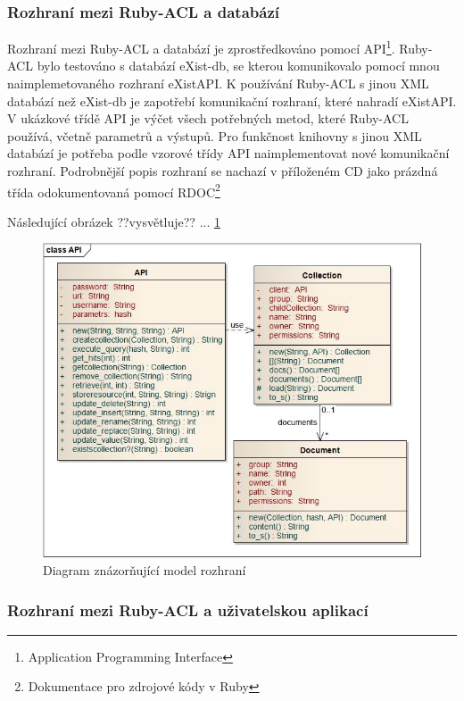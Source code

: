 \subsubsection{Rozhraní mezi Ruby-ACL a databází}
Rozhraní mezi Ruby-ACL a databází je zprostředkováno pomocí API\footnote[1]{Application Programming Interface}.
Ruby-ACL bylo testováno s databází eXist-db, se kterou komunikovalo pomocí mnou naimplemetovaného rozhraní eXistAPI. 
K používání Ruby-ACL s jinou XML databází než eXist-db je zapotřebí komunikační rozhraní, které nahradí eXistAPI. 
V ukázkové třídě API je výčet všech potřebných metod, které Ruby-ACL používá, včetně parametrů a výstupů. Pro funkčnost knihovny s jinou XML databází je potřeba podle vzorové třídy API naimplementovat nové komunikační rozhraní. 
Podrobnější popis rozhraní se nachazí v příloženém CD jako prázdná třída odokumentovaná pomocí RDOC\footnote[2]{Dokumentace pro zdrojové kódy v Ruby}

Následující obrázek ??vysvětluje?? ... \ref{fig:API_interface}

\begin{figure}
\includegraphics[width=15cm]{API1.jpg}
\caption{Diagram znázorňující model rozhraní}
\label{fig:API_interface}
\end{figure}



\subsubsection{Rozhraní mezi Ruby-ACL a uživatelskou aplikací}


